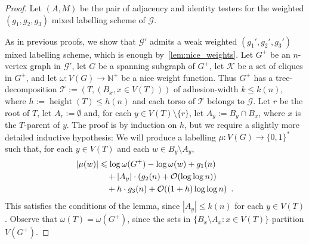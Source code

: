 \documentclass{patmorin}
\renewcommand{\le}{\leqslant}
\newcommand{\pat}[1]{\textcolor{Magenta}{PaMo: #1}}
\DeclareMathOperator{\height}{height}
\newcommand{\NN}{\mathbb{N}}
\newcommand{\Oh}{\calO}
\newcommand{\calG}{\mathcal{G}}
\newcommand{\calK}{\mathcal{K}}
\newcommand{\calO}{\mathcal{O}}
\newcommand{\calT}{\mathcal{T}}
\begin{document}
  \begin{proof}
    Let $(A,M)$ be the pair of adjacency and identity testers for the weighted $(g_1,g_2,g_3)$ mixed labelling scheme of $\calG$. 
  
    As in previous proofs,  we show that $\calG'$ admits a weak weighted $(g_1',g_2',g_3')$ mixed labelling scheme, which is enough by~\cref{lem:nice_weights}.  
    Let $G^+$ be an $n$-vertex graph in $\calG'$, let $G$ be a spanning subgraph of $G^+$, let $\calK$ be a set of cliques in $G^+$, and let $\omega:V(G)\to\NN^+$ be a nice weight function.    
    Thus $G^+$ has a tree-decomposition $\calT:=(T,(B_x,x\in V(T)))$ of adhesion-width $k\le k(n)$, where $h:=\height(T)\le h(n)$ and each torso of $\calT$ belongs to $\calG$.
    Let $r$ be the root of $T$, let $A_r:=\emptyset$ and, for each $y\in V(T)\setminus\{r\}$, let $A_y:=B_y\cap B_x$, where $x$ is the $T$-parent of $y$.
    The proof is by induction on $h$, but we require a slightly more detailed inductive hypothesis: We will produce a labelling $\mu:V(G)\to\{0,1\}^*$ such that, for each $y\in V(T)$ and each $w\in B_y\setminus A_y$,      
    \begin{align}
       |\mu(w)|
       & \le \log \omega(G^+) - \log \omega(w) + g_1(n) \notag \\
       & \quad {} + |A_y|\cdot (g_2(n) + \Oh(\log\log n)) \label{strong_strong} \\
       & \quad {} + h\cdot g_3(n) + \Oh((1+h)\log\log n) \enspace . \notag
    \end{align}
    This satisfies the conditions of the lemma, since $|A_y|\le k(n)$ for each $y\in V(T)$.
    Observe that $\omega(T)=\omega(G^+)$, since the sets in $\{B_x\setminus A_x:x\in V(T)\}$ partition $V(G^+)$.


\end{proof}
\end{document}
